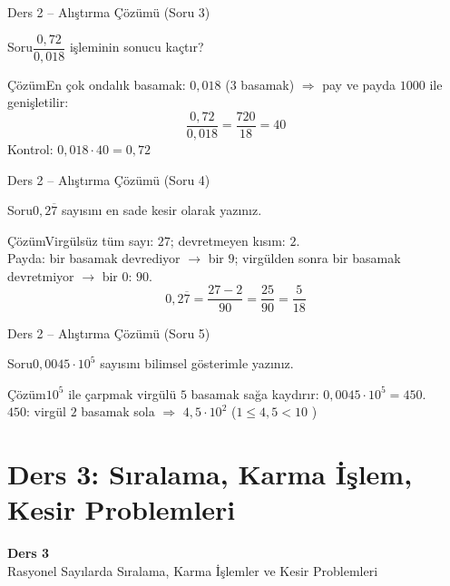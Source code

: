 \documentclass[aspectratio=169,11pt,handout]{beamer}
\newcommand{\soru}[3]{%
\begin{frame}{#1}
  \begin{block}{Soru}\large #2\end{block}
  \pause
  \begin{exampleblock}{Çözüm}\large #3\end{exampleblock}
\end{frame}}
\newcommand{\ab}[1]{\overline{#1}}
\begin{document}
\soru{Ders 2 -- Alıştırma Çözümü (Soru 3)}
{\(\dfrac{0{,}72}{0{,}018}\) işleminin sonucu kaçtır?}
{En çok ondalık basamak: \(0{,}018\) (\(3\) basamak) \(\Rightarrow\) pay ve payda \(1000\) ile genişletilir:
\[\frac{0{,}72}{0{,}018}=\frac{720}{18}=40\]
Kontrol: \(0{,}018\cdot 40=0{,}72\) \checkmark}

\soru{Ders 2 -- Alıştırma Çözümü (Soru 4)}
{\(0{,}2\ab{7}\) sayısını en sade kesir olarak yazınız.}
{Virgülsüz tüm sayı: \(27\); devretmeyen kısım: \(2\).\\[3pt]
Payda: bir basamak devrediyor \(\to\) bir \(9\); virgülden sonra bir basamak devretmiyor \(\to\) bir \(0\): \(90\).
\[0{,}2\ab{7}=\frac{27-2}{90}=\frac{25}{90}=\frac{5}{18}\]}

\soru{Ders 2 -- Alıştırma Çözümü (Soru 5)}
{\(0{,}0045\cdot 10^{5}\) sayısını bilimsel gösterimle yazınız.}
{\(10^{5}\) ile çarpmak virgülü \(5\) basamak sağa kaydırır: \(0{,}0045\cdot 10^{5}=450\).\\[3pt]
\(450\): virgül \(2\) basamak sola \(\Rightarrow\) \(4{,}5\cdot 10^{2}\) \quad (\(1\le 4{,}5<10\) \checkmark)}

\section{Ders 3: Sıralama, Karma İşlem, Kesir Problemleri}
\begin{frame}
\centering\Large\color{anamavi}\textbf{Ders 3}\\[6pt]\normalsize Rasyonel Sayılarda Sıralama, Karma İşlemler ve Kesir Problemleri
\end{frame}
\end{document}
